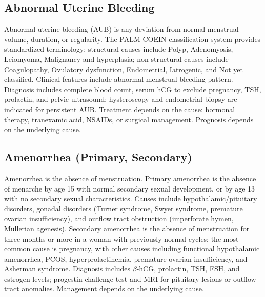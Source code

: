 
\label{sec:Menstrual and Hormonal Disorders}

\subsection{Abnormal Uterine Bleeding}
\label{sec:Abnormal Uterine Bleeding}
Abnormal uterine bleeding (AUB) is any deviation from normal menstrual volume, duration, or regularity. The PALM-COEIN classification system provides standardized terminology: structural causes include Polyp, Adenomyosis, Leiomyoma, Malignancy and hyperplasia; non-structural causes include Coagulopathy, Ovulatory dysfunction, Endometrial, Iatrogenic, and Not yet classified. Clinical features include abnormal menstrual bleeding pattern. Diagnosis includes complete blood count, serum hCG to exclude pregnancy, TSH, prolactin, and pelvic ultrasound; hysteroscopy and endometrial biopsy are indicated for persistent AUB. Treatment depends on the cause: hormonal therapy, tranexamic acid, NSAIDs, or surgical management. Prognosis depends on the underlying cause.

\subsection{Amenorrhea (Primary, Secondary)}
\label{sec:Amenorrhea}
Amenorrhea is the absence of menstruation. Primary amenorrhea is the absence of menarche by age 15 with normal secondary sexual development, or by age 13 with no secondary sexual characteristics. Causes include hypothalamic/pituitary disorders, gonadal disorders (Turner syndrome, Swyer syndrome, premature ovarian insufficiency), and outflow tract obstruction (imperforate hymen, M\"ullerian agenesis). Secondary amenorrhea is the absence of menstruation for three months or more in a woman with previously normal cycles; the most common cause is pregnancy, with other causes including functional hypothalamic amenorrhea, PCOS, hyperprolactinemia, premature ovarian insufficiency, and Asherman syndrome. Diagnosis includes $\beta$-hCG, prolactin, TSH, FSH, and estrogen levels; progestin challenge test and MRI for pituitary lesions or outflow tract anomalies. Management depends on the underlying cause.

